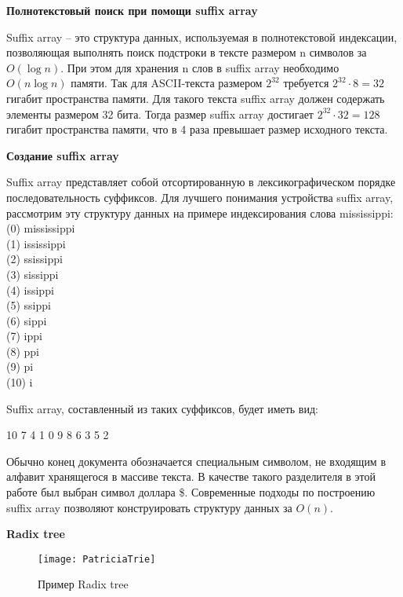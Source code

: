 \textbf{Полнотекстовый поиск при помощи suffix array}

Suffix array -- это структура данных, используемая в полнотекстовой индексации, позволяющая выполнять
поиск подстроки в тексте размером n символов за $O(\log{}n)$.
При этом для хранения n слов в suffix array необходимо $O(n \log{}n)$ памяти.
Так для ASCII-текста размером $2^{32}$ требуется $2^{32} \cdot 8 = 32$ гигабит пространства памяти.
Для такого текста suffix array должен содержать элементы размером 32 бита.
Тогда размер suffix array достигает $2^{32} \cdot 32 = 128$ гигабит пространства памяти,
что в 4 раза превышает размер исходного текста.

\textbf{Создание suffix array}

Suffix array представляет собой отсортированную в лексикографическом порядке
последовательность суффиксов. Для лучшего понимания устройства suffix array, рассмотрим эту структуру данных на примере индексирования
слова mississippi:
\\(0) mississippi
\\(1) ississippi
\\(2) ssissippi
\\(3) sissippi
\\(4) issippi
\\(5) ssippi
\\(6) sippi
\\(7) ippi
\\(8) ppi
\\(9) pi
\\(10) i

Suffix array, составленный из таких суффиксов, будет иметь вид:

10 7 4 1 0 9 8 6 3 5 2

Обычно конец документа обозначается специальным символом, не входящим в алфавит хранящегося в массиве текста.
В качестве такого разделителя в этой работе был выбран символ доллара \$.
Современные подходы по построению suffix array позволяют конструировать структуру данных за $O(n)$.

\textbf{Radix tree}


\begin{wrapfigure}{r}{0.25\textwidth} %
 \centering
 \texttt{[image: PatriciaTrie]}
 \caption{Пример Radix tree}
\end{wrapfigure}

